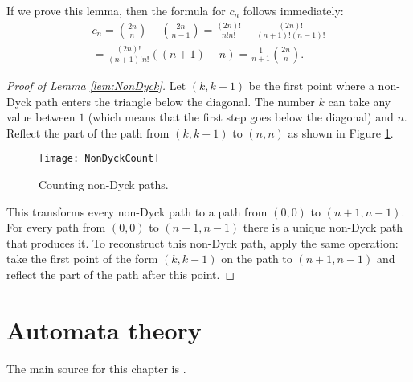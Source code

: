 \begin{page}
\setcounter{section}{0}
\setcounter{subsection}{0}
\setcounter{dfn}{10}
\label{portion:1005}


If we prove this lemma, then the formula for $c_n$ follows immediately:
\begin{multline*}
c_n = \binom{2n}{n} - \binom{2n}{n-1} = \frac{(2n)!}{n!n!} - \frac{(2n)!}{(n+1)!(n-1)!}\\
= \frac{(2n)!}{(n+1)!n!}((n+1) - n) = \frac{1}{n+1} \binom{2n}{n}.
\end{multline*}


\begin{proof}[Proof of Lemma \ref{lem:NonDyck}]
Let $(k,k-1)$ be the first point where a non-Dyck path enters the triangle below the diagonal.
The number $k$ can take any value between $1$ (which means that the first step goes below the diagonal) and $n$.
Reflect the part of the path from $(k,k-1)$ to $(n,n)$ as shown in Figure \ref{fig:NonDyckCount}.

\begin{figure}[ht]
\begin{center}
\texttt{[image: NonDyckCount]}
\end{center}
\caption{Counting non-Dyck paths.}
\label{fig:NonDyckCount}
\end{figure}

This transforms every non-Dyck path to a path from $(0,0)$ to $(n+1,n-1)$.
For every path from $(0,0)$ to $(n+1,n-1)$ there is a unique non-Dyck path that produces it.
To reconstruct this non-Dyck path, apply the same operation: take the first point of the form $(k,k-1)$ on the path to $(n+1,n-1)$
and reflect the part of the path after this point.
\end{proof}




\end{page}

\begin{page}
\setcounter{section}{1}
\setcounter{subsection}{0}
\setcounter{dfn}{10}
\label{portion:1007}

\chapter{Automata theory}
The main source for this chapter is \cite{HU79}.

\end{page}

